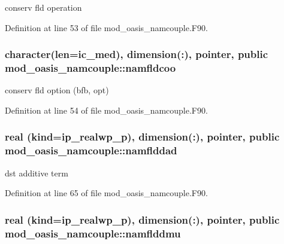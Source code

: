 conserv fld operation 



Definition at line 53 of file mod\+\_\+oasis\+\_\+namcouple.\+F90.

\hypertarget{classmod__oasis__namcouple_a119b86702766d5392cb44856448bcd3e}{
\subsubsection[{namfldcoo}]{\setlength{\rightskip}{0pt plus 5cm}character(len=ic\+\_\+med), dimension(\+:), pointer, public mod\+\_\+oasis\+\_\+namcouple\+::namfldcoo}}\label{classmod__oasis__namcouple_a119b86702766d5392cb44856448bcd3e}


conserv fld option (bfb, opt) 



Definition at line 54 of file mod\+\_\+oasis\+\_\+namcouple.\+F90.

\hypertarget{classmod__oasis__namcouple_af1e31f45ea1cd7a7b64a8a7dc2cec4ee}{
\subsubsection[{namflddad}]{\setlength{\rightskip}{0pt plus 5cm}real (kind=ip\+\_\+realwp\+\_\+p), dimension(\+:), pointer, public mod\+\_\+oasis\+\_\+namcouple\+::namflddad}}\label{classmod__oasis__namcouple_af1e31f45ea1cd7a7b64a8a7dc2cec4ee}


dst additive term 



Definition at line 65 of file mod\+\_\+oasis\+\_\+namcouple.\+F90.

\hypertarget{classmod__oasis__namcouple_ad81bb4f19a71f0fcf8655cb9d39a3380}{
\subsubsection[{namflddmu}]{\setlength{\rightskip}{0pt plus 5cm}real (kind=ip\+\_\+realwp\+\_\+p), dimension(\+:), pointer, public mod\+\_\+oasis\+\_\+namcouple\+::namflddmu}}\label{classmod__oasis__namcouple_ad81bb4f19a71f0fcf8655cb9d39a3380}


